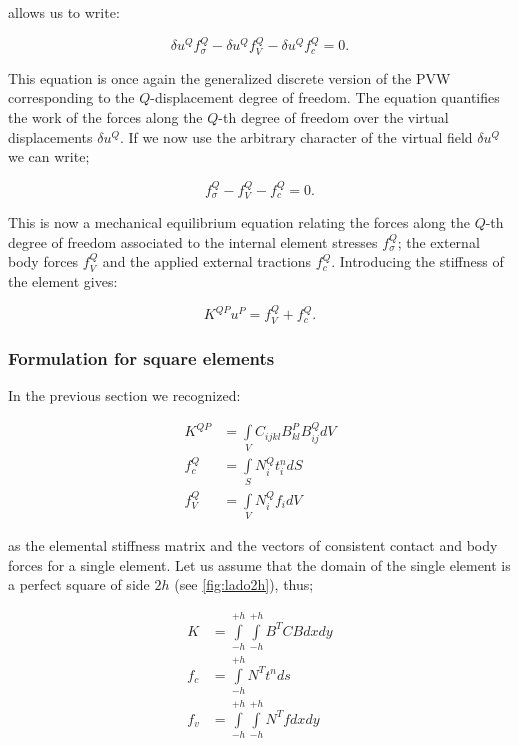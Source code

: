 allows us to write:


\[ \delta u^Q f_\sigma ^Q - \delta {u^Q}f_V^Q - \delta u^Q f_c^Q = 0. \]

This equation is once again the generalized discrete version of the PVW corresponding to the $Q$-displacement degree of freedom. The equation quantifies the work of the forces along the $Q$-th degree of freedom over the virtual displacements $\delta u^Q$. If we now use the arbitrary character of the virtual field $\delta u^Q $ we can write;

\begin{equation}
f_\sigma ^Q - f_V^Q - f_c^Q = 0.
\label{forces}
\end{equation}

This is now a mechanical equilibrium equation relating the forces along the $Q$-th degree of freedom associated to the internal element stresses $f_\sigma ^Q$; the external body forces $f_V^Q$ and the applied external tractions $f_c^Q$. Introducing the stiffness of the element gives:

\begin{equation}
K^{QP} u^P = f_V^Q + f_c^Q.
\label{Discreta}
\end{equation}

\subsubsection{Formulation for square elements}
In the previous section we recognized:

\begin{equation}
\begin{aligned}
{K^{QP}} & = \int\limits_V {{C_{ijkl}}B_{kl}^PB_{ij}^QdV} \\
f_c^Q    & = \int\limits_S {N_i^Qt_i^ndS} \\
f_V^Q    & = \int\limits_V {N_i^Q{f_i}dV}
\label{Rigi}
\end{aligned}
\end{equation}



as the elemental stiffness matrix and the vectors of consistent contact and body forces for a single element. Let us assume that the domain of the single element is a perfect square of side $2h$ (see \cref{fig:lado2h}), thus;

\begin{equation}
\begin{aligned}
K & = \int\limits_{ - h}^{ + h} {\int\limits_{ - h}^{ + h} {{B^T}CBdxdy} } \\
{f_c} & = \int\limits_{ - h}^{ + h} {{N^T}{t^n}ds} \\
{f_v} & = \int\limits_{ - h}^{ + h} {\int\limits_{ - h}^{ + h} {{N^T}fdxdy} }
\label{ele2}
\end{aligned}
\end{equation}

